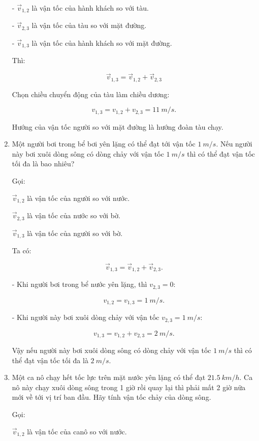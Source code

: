 \begin{enumerate}[label=\bfseries Bài \arabic*:,leftmargin=1.5cm]
{\begin{enumerate}[label=\alph*)]
			- $\vec v_{1,2}$ là vận tốc của hành khách so với tàu.
			
			- $\vec v_{2,3}$ là vận tốc của tàu so với mặt đường.
			
			- $\vec v_{1,3}$ là vận tốc của hành khách so với mặt đường.
			
			Thì:
			
			$$\vec v_{1,3} = \vec v_{1,2} + \vec v_{2,3}$$
			
			Chọn chiều chuyển động của tàu làm chiều dương:
			
			$$v_{1,3} = v_{1,2} + v_{2,3} = \SI{11}{m/s}.$$
			
			Hướng của vận tốc người so với mặt đường là hướng đoàn tàu chạy.
		\end{enumerate}
	}

	\item {}
	
	
	{
		Một người bơi trong bể bơi yên lặng có thể đạt tới vận tốc $\SI{1}{m/s}$. Nếu người này bơi xuôi dòng sông có dòng chảy với vận tốc $\SI{1}{m/s}$ thì có thể đạt vận tốc tối đa là bao nhiêu?
	}
	\hideall
	{
		Gọi:
		
		$\vec v_{1,2}$ là vận tốc của người so với nước.
		
		$\vec v_{2,3}$ là vận tốc của nước so với bờ.
		
		$\vec v_{1,3}$ là vận tốc của người so với bờ.
		
		Ta có:
		
		$$\vec v_{1,3} = \vec v_{1,2} + \vec v_{2,3}.$$
		
		- Khi người bơi trong bể nước yên lặng, thì $v_{2,3} = 0$:
		
		$$v_{1,2} = v_{1,3} = \SI{1}{m/s}.$$
		
		- Khi người này bơi xuôi dòng chảy với vận tốc $v_{2,3} = \SI{1}{m/s}$:
		
		
		$$v_{1,3} = v_{1,2} + v_{2,3} = \SI{2}{m/s}.$$
		
		Vậy nếu người này bơi xuôi dòng sông có dòng chảy với vận tốc $\SI{1}{m/s}$ thì có thể đạt vận tốc tối đa là $\SI{2}{m/s}.$
		
		
	}
	\item {}
	
	
	{
		Một ca nô chạy hết tốc lực trên mặt nước yên lặng có thể đạt $\SI{21,5}{km/h}$. Ca nô này chạy xuôi dòng sông trong 1 giờ rồi quay lại thì phải mất 2 giờ nữa mới về tới vị trí ban đầu. Hãy tính vận tốc chảy của dòng sông.
	}
	\hideall
	{
		Gọi:
		
		$\vec v_{1,2}$ là vận tốc của canô so với nước.
		
}
\end{enumerate}
